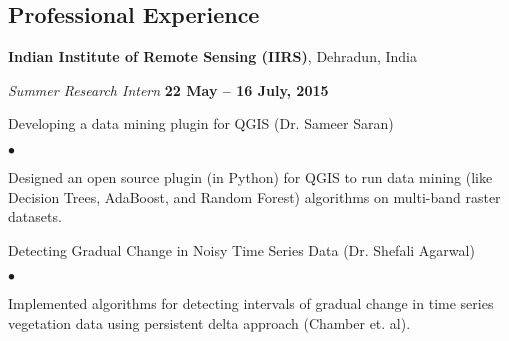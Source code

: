 \documentclass[margin,line]{res}
\newenvironment{list1}{
  \begin{list}{\ding{113}}{%
      \setlength{\itemsep}{0in}
      \setlength{\parsep}{0in} \setlength{\parskip}{0in}
      \setlength{\topsep}{0in} \setlength{\partopsep}{0in} 
      \setlength{\leftmargin}{0.17in}}}{\end{list}}
\newenvironment{list2}{
  \begin{list}{$\bullet$}{%
      \setlength{\itemsep}{0in}
      \setlength{\parsep}{0in} \setlength{\parskip}{0in}
      \setlength{\topsep}{0in} \setlength{\partopsep}{0in} 
      \setlength{\leftmargin}{0.2in}}}{\end{list}}
\begin{document}
\begin{resume}
%
%
%
%

\section{\sc Professional Experience}
{\bf Indian Institute of Remote Sensing (IIRS)}, Dehradun, India

\vspace{-.3cm}
{\em Summer Research Intern} \hfill {\bf 22 May -- 16 July, 2015}\\
\vspace*{-.1in}
\begin{list1}
\item[] Developing a data mining plugin for QGIS (Dr. Sameer Saran)
\begin{list2}
\vspace*{.05in}
\item Designed an open source plugin (in Python) for QGIS to run data mining (like Decision Trees, AdaBoost, and Random Forest) algorithms on multi-band raster datasets.
\end{list2}
\vspace*{.05in}
\item[] Detecting Gradual Change in Noisy Time Series Data (Dr. Shefali Agarwal)
\begin{list2}
\vspace*{.05in}
\item Implemented algorithms for detecting intervals of gradual change in time series vegetation data using persistent delta approach (Chamber et. al).
\end{list2}
\end{list1}


\end{resume}
\end{document}
